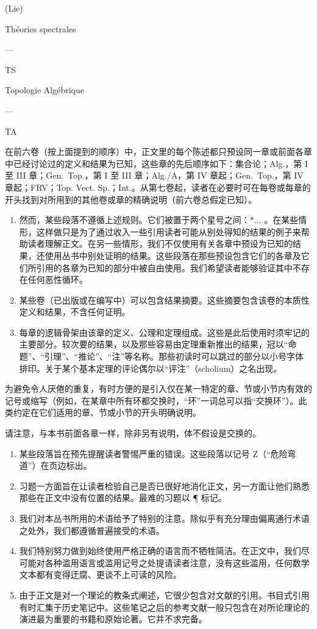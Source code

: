 (Lie)

Théories spectrales

---

TS

Topologie Algébrique

---

TA

在前六卷（按上面提到的顺序）中，正文里的每个陈述都只预设同一章或前面各章中已经讨论过的定义和结果为已知，这些章的先后顺序如下：集合论；Alg.，第 I 至 III 章；Gen.~Top.，第 I 至 III 章；Alg./A，第 IV 章起；Gen.~Top.，第 IV 章起；FRV；Top. Vect. Sp.；Int.。从第七卷起，读者在必要时可在每卷或每章的开头找到对所用到的其他卷或章的精确说明（前六卷总假定已知）。

\begin{enumerate}
\def\labelenumi{\arabic{enumi}.}
\setcounter{enumi}{3}
\item
  然而，某些段落不遵循上述规则。它们被置于两个星号之间：\(*\ldots\) 。在某些情形，这样做只是为了通过收入一些引用读者可能从别处得知的结果的例子来帮助读者理解正文。在另一些情形，我们不仅使用有关各章中预设为已知的结果，还使用丛书中别处证明的结果。这些段落在那些预设包含它们的各章及它们所引用的各章为已知的部分中被自由使用。我们希望读者能够验证其中不存在任何恶性循环。
\item
  某些卷（已出版或在编写中）可以包含结果摘要。这些摘要包含该卷的本质性定义和结果，不含任何证明。
\item
  每章的逻辑骨架由该章的定义、公理和定理组成。这些是此后使用时须牢记的主要部分。较次要的结果，以及那些容易由定理重新推出的结果，冠以``命题''、``引理''、``推论''、``注''等名称。那些初读时可以跳过的部分以小号字体排印。关于某个基本定理的评论偶尔以``评注''（scholium）之名出现。
\end{enumerate}

为避免令人厌倦的重复，有时方便的是引入仅在某一特定的章、节或小节内有效的记号或缩写（例如，在某章中所有环都交换时，``环''一词总可以指``交换环''）。此类约定在它们适用的章、节或小节的开头明确说明。

请注意，与本书前面各章一样，除非另有说明，体不假设是交换的。

\begin{enumerate}
\def\labelenumi{\arabic{enumi}.}
\setcounter{enumi}{6}
\item
  某些段落旨在预先提醒读者警惕严重的错误。这些段落以记号 Z（``危险弯道''）在页边标出。
\item
  习题一方面旨在让读者检验自己是否已很好地消化正文，另一方面让他们熟悉那些在正文中没有位置的结果。最难的习题以 ¶ 标记。
\item
  我们对本丛书所用的术语给予了特别的注意。除似乎有充分理由偏离通行术语之处外，我们都遵循普遍接受的术语。
\item
  我们特别努力做到始终使用严格正确的语言而不牺牲简洁。在正文中，我们尽可能对各种滥用语言或滥用记号之处提请读者注意，没有这些滥用，任何数学文本都有变得迂腐、更谈不上可读的风险。
\item
  由于正文是对一个理论的教条式阐述，它很少包含对文献的引用。书目式引用有时汇集于历史笔记中。这些笔记之后的参考文献一般只包含在对所论理论的演进最为重要的书籍和原始论著。它并不求完备。
\end{enumerate}

